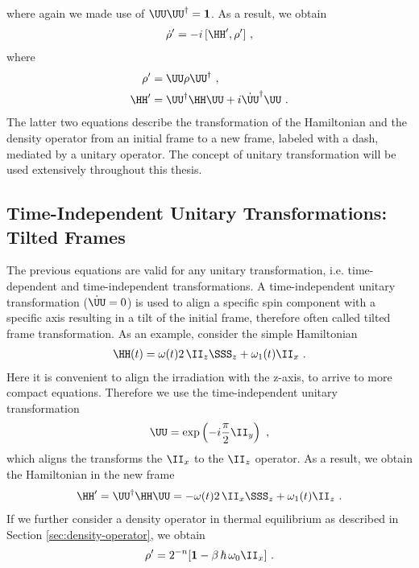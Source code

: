 where again we made use of $\UU\UU^{\dagger} = \mathbf{1}$.
As a result, we obtain
\begin{align}
 \dot{\rho}'
  = -i\, [\HH', \rho']~,
\end{align}
where
\begin{align}
  \rho'&=\UU\rho\UU^\dagger~,\\
  \HH' &= \UU^\dagger \HH \UU  + i \dot{\UU}^\dagger \UU~.
\end{align}
The latter two equations describe the transformation of the Hamiltonian and the density operator from an initial frame to a new frame, labeled with a dash, mediated by a unitary operator.
The concept of unitary transformation will be used extensively throughout this thesis.
\subsection{Time-Independent Unitary Transformations: Tilted Frames}
The previous equations are valid for any unitary transformation, i.e. time-dependent and time-independent transformations. 
A time-independent unitary transformation ($\dot{\UU}=0$) is used to align a specific spin component with a specific axis resulting in a tilt of the initial frame, therefore often called tilted frame transformation.
As an example, consider the simple Hamiltonian
\begin{align}
  \HH(t) = \omega(t) 2\, \II_z\SSS_z +\omega_1(t) \II_x~.
\end{align}
Here it is convenient to align the irradiation with the z-axis, to arrive to more compact equations.
Therefore we use the time-independent unitary transformation
\begin{align}
  \UU = \exp\left(-i \frac{\pi}{2}\II_y\right)~,
\end{align}
which aligns the transforms the $\II_x$ to the $\II_z$ operator.
As a result, we obtain the Hamiltonian in the new frame
\begin{align}
  \HH' = \UU^\dagger \HH \UU = - \omega(t) 2\, \II_x\SSS_z +\omega_1(t) \II_z~.
\end{align}
If we further consider a density operator in thermal equilibrium as described in Section \ref{sec:density-operator}, we obtain
\begin{align}
  \rho' = 2^{-n}[\mathbf{1}-\beta \,\hbar\,  \omega_0 \II_x]~.
\end{align}
